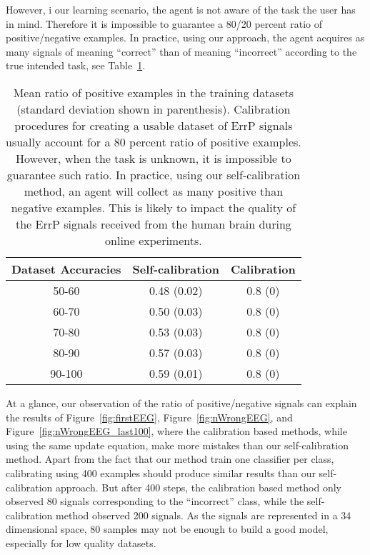 However, i our learning scenario, the agent is not aware of the task the user has in mind. Therefore it is impossible to guarantee a 80/20 percent ratio of positive/negative examples. In practice, using our approach, the agent acquires as many signals of meaning ``correct'' than of meaning ``incorrect'' according to the true intended task, see Table~\ref{tab:correctLabelRatio}.

\begin{table}
\centering
{}
\begin{tabular}{c c c}
Dataset Accuracies & Self-calibration & Calibration \\ \hline
50-60 & 0.48 (0.02) & 0.8 (0) \\
60-70 & 0.50 (0.03) & 0.8 (0) \\
70-80 & 0.53 (0.03) & 0.8 (0) \\
80-90 & 0.57 (0.03) & 0.8 (0) \\
90-100 & 0.59 (0.01) & 0.8 (0) \\
\end{tabular}
\caption{Mean ratio of positive examples in the training datasets (standard deviation shown in parenthesis). Calibration procedures for creating a usable dataset of ErrP signals usually account for a 80 percent ratio of positive examples. However, when the task is unknown, it is impossible to guarantee such ratio. In practice, using our self-calibration method, an agent will collect as many positive than negative examples. This is likely to impact the quality of the ErrP signals received from the human brain during online experiments.}
\label{tab:correctLabelRatio}
\end{table}

At a glance, our observation of the ratio of positive/negative signals can explain the results of Figure~\ref{fig:firstEEG}, Figure~\ref{fig:nWrongEEG}, and Figure~\ref{fig:nWrongEEG_last100}, where the calibration based methods, while using the same update equation, make more mistakes than our self-calibration method. Apart from the fact that our method train one classifier per class, calibrating using 400 examples should produce similar results than our self-calibration approach. But after 400 steps, the calibration based method only observed 80 signals corresponding to the ``incorrect'' class, while the self-calibration method observed 200 signals. As the signals are represented in a 34 dimensional space, 80 samples may not be enough to build a good model, especially for low quality datasets.

